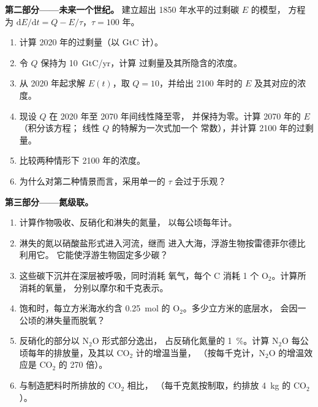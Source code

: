 \begin{problem}
\medskip
\noindent\textbf{第二部分——未来一个世纪。}
建立超出 1850 年水平的过剩碳 $E$ 的模型，
方程为 $\mathrm{d}E/\mathrm{d}t = Q - E/\tau$，$\tau = 100$ 年。
\begin{enumerate}[resume]
  \item 计算 2020 年的过剩量（以 GtC 计）。
  \item 令 $Q$ 保持为 \qty{10}{GtC/yr}，计算
        过剩量及其所隐含的浓度。
  \item 从 2020 年起求解 $E(t)$，取 $Q = 10$，并给出
        2100 年时的 $E$ 及其对应的浓度。
  \item 现设 $Q$ 在 2020 年至 2070 年间线性降至零，
        并保持为零。计算 2070 年的 $E$（积分该方程；
        线性 $Q$ 的特解为一次式加一个
        常数），并计算 2100 年的过剩量。
  \item 比较两种情形下 2100 年的浓度。
  \item 为什么对第二种情景而言，采用单一的 $\tau$ 会过于乐观？
\end{enumerate}

\medskip
\noindent\textbf{第三部分——氮级联。}
\begin{enumerate}[resume]
  \item 计算作物吸收、反硝化和淋失的氮量，
        以每公顷每年计。
  \item 淋失的氮以硝酸盐形式进入河流，继而
        进入大海，浮游生物按雷德菲尔德比利用它。
        它能使浮游生物固定多少碳？
  \item 这些碳下沉并在深层被呼吸，同时消耗
        氧气，每个 C 消耗 1 个 $\mathrm{O_2}$。计算所消耗的氧量，
        分别以摩尔和千克表示。
  \item 饱和时，每立方米海水约含 \qty{0.25}{mol} 的
        $\mathrm{O_2}$。多少立方米的底层水，
        会因一公顷的淋失量而脱氧？
  \item 反硝化的部分以 $\mathrm{N_2O}$ 形式部分逸出，
        占反硝化氮量的 \qty{1}{\%}。计算 $\mathrm{N_2O}$
        每公顷每年的排放量，及其以 $\mathrm{CO_2}$ 计的增温当量，
        （按每千克计，$\mathrm{N_2O}$ 的增温效应是 $\mathrm{CO_2}$ 的 270 倍）。
  \item 与制造肥料时所排放的 $\mathrm{CO_2}$ 相比，
        （每千克氮按制取，约排放 \qty{4}{kg}
        的 $\mathrm{CO_2}$）。
\end{enumerate}


\end{problem}
